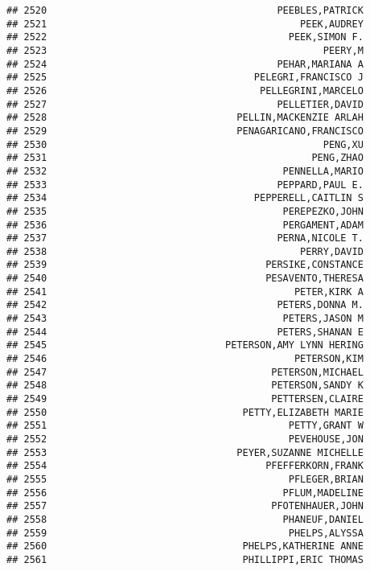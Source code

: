 \documentclass[
]{article}
\begin{document}
\begin{verbatim}
## 2520                                        PEEBLES,PATRICK
## 2521                                            PEEK,AUDREY
## 2522                                          PEEK,SIMON F.
## 2523                                                PEERY,M
## 2524                                        PEHAR,MARIANA A
## 2525                                    PELEGRI,FRANCISCO J
## 2526                                     PELLEGRINI,MARCELO
## 2527                                        PELLETIER,DAVID
## 2528                                 PELLIN,MACKENZIE ARLAH
## 2529                                 PENAGARICANO,FRANCISCO
## 2530                                                PENG,XU
## 2531                                              PENG,ZHAO
## 2532                                         PENNELLA,MARIO
## 2533                                        PEPPARD,PAUL E.
## 2534                                    PEPPERELL,CAITLIN S
## 2535                                         PEREPEZKO,JOHN
## 2536                                         PERGAMENT,ADAM
## 2537                                        PERNA,NICOLE T.
## 2538                                            PERRY,DAVID
## 2539                                      PERSIKE,CONSTANCE
## 2540                                      PESAVENTO,THERESA
## 2541                                           PETER,KIRK A
## 2542                                        PETERS,DONNA M.
## 2543                                         PETERS,JASON M
## 2544                                        PETERS,SHANAN E
## 2545                               PETERSON,AMY LYNN HERING
## 2546                                           PETERSON,KIM
## 2547                                       PETERSON,MICHAEL
## 2548                                       PETERSON,SANDY K
## 2549                                       PETTERSEN,CLAIRE
## 2550                                  PETTY,ELIZABETH MARIE
## 2551                                          PETTY,GRANT W
## 2552                                          PEVEHOUSE,JON
## 2553                                 PEYER,SUZANNE MICHELLE
## 2554                                      PFEFFERKORN,FRANK
## 2555                                          PFLEGER,BRIAN
## 2556                                         PFLUM,MADELINE
## 2557                                       PFOTENHAUER,JOHN
## 2558                                         PHANEUF,DANIEL
## 2559                                          PHELPS,ALYSSA
## 2560                                  PHELPS,KATHERINE ANNE
## 2561                                  PHILLIPPI,ERIC THOMAS

\end{verbatim}
\end{document}
